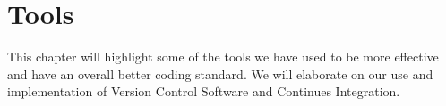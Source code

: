 \chapter{Tools}\label{cha:tools}
This chapter will highlight some of the tools we have used to be more effective and have an overall better coding standard.
We will elaborate on our use and implementation of Version Control Software and Continues Integration.


